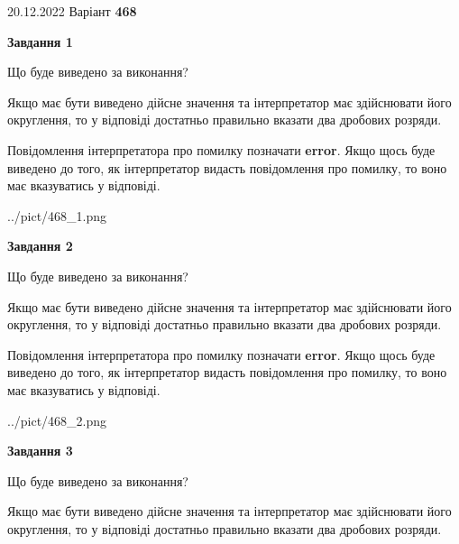 \documentclass[12pt, ukrainian]{article}
\begin{document}
{20.12.2022 Варіант \No \textbf { 468 }\par}
{
\begin {Large}

{\begin {center}\textbf{Завдання 1}\end {center}}\par
Що буде виведено за виконання? \par

Якщо має бути виведено дійсне значення та інтерпретатор має здійснювати його округлення, 
то у відповіді достатньо правильно вказати два дробових розряди.

Повідомлення інтерпретатора про помилку позначати \textbf{error}.
Якщо щось буде виведено до того, як інтерпретатор видасть повідомлення про помилку, 
то воно має вказуватись у відповіді. \par

\begin{center}
	{../pict/468_1.png}
\end{center}
\newpage

{\begin {center}\textbf{Завдання 2}\end {center}}\par
Що буде виведено за виконання? \par

Якщо має бути виведено дійсне значення та інтерпретатор має здійснювати його округлення, 
то у відповіді достатньо правильно вказати два дробових розряди.

Повідомлення інтерпретатора про помилку позначати \textbf{error}.
Якщо щось буде виведено до того, як інтерпретатор видасть повідомлення про помилку, 
то воно має вказуватись у відповіді. \par

\begin{center}
	{../pict/468_2.png}
\end{center}
\newpage

{\begin {center}\textbf{Завдання 3}\end {center}}\par
Що буде виведено за виконання? \par

Якщо має бути виведено дійсне значення та інтерпретатор має здійснювати його округлення, 
то у відповіді достатньо правильно вказати два дробових розряди.


\end{Large}}
\end{document}
